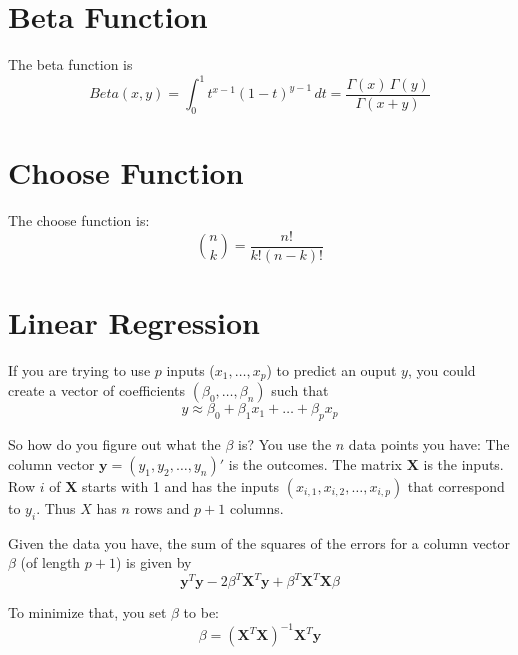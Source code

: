 \documentclass[12pt]{article}
\begin{document}
\section*{Beta Function}

The beta function is 
\begin{equation*}
Beta(x,y) = \int_0^1t^{x-1}(1-t)^{y-1}\,dt = \frac{\Gamma(x)\,\Gamma(y)}{\Gamma(x+y)}
\end{equation*}

\section*{Choose Function}

The choose function is:
\begin{equation*}
\binom{n}{k} = \frac{n!}{k! (n-k)!}
\end{equation*}


\section*{Linear Regression}

If you are trying to use $p$ inputs ($x_1, \ldots, x_p$) to predict an ouput $y$, you could create a vector of coefficients $(\beta_0, \ldots, \beta_n)$ such that
\begin{equation*}
y \approx \beta_0 + \beta_1 x_1 + \ldots + \beta_p x_p
\end{equation*}

So how do you figure out what the $\beta$ is? You use the $n$ data points you have: The column vector $\boldsymbol{y} = (y_1, y_2, \ldots, y_n)'$ is the outcomes. The matrix $\boldsymbol{X}$ is the inputs.  Row $i$ of $\boldsymbol{X}$ starts with 1 and has the inputs $(x_{i,1}, x_{i,2},\ldots,x_{i, p})$ that correspond to $y_i$. Thus $X$ has $n$ rows and $p+1$ columns.

Given the data you have, the sum of the squares of the errors for a column vector $\beta$ (of length $p + 1$) is given by 
\begin{equation*}
\boldsymbol{y}^T \boldsymbol{y} - 2 \beta^T \boldsymbol{X}^T \boldsymbol{y} + \beta^T \boldsymbol{X}^T \boldsymbol{X} \beta
\end{equation*}

To minimize that, you set $\beta$ to be:
\begin{equation*}
\beta = \left( \boldsymbol{X}^T \boldsymbol{X} \right)^{-1} \boldsymbol{X}^T \boldsymbol{y}
\end{equation*}
\end{document}
